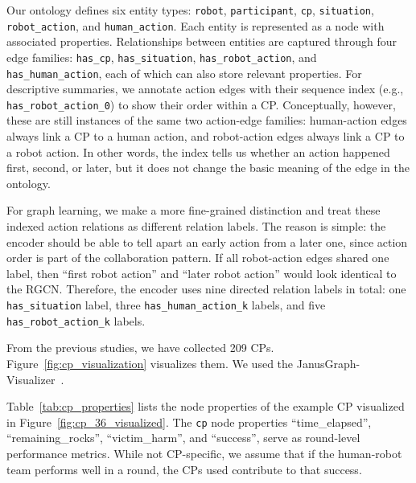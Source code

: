 \documentclass[letterpaper, 10 pt, conference]{ieeeconf}  %
\begin{document}
Our ontology defines six entity types: \texttt{robot}, \texttt{participant},
\texttt{cp}, \texttt{situation}, \texttt{robot\_action}, and \texttt{human\_action}.
Each entity is represented as a node with associated properties. Relationships between
entities are captured through four edge families: \texttt{has\_cp},
\texttt{has\_situation}, \texttt{has\_robot\_action}, and \texttt{has\_human\_action},
each of which can also store relevant properties. For descriptive summaries, we annotate
action edges with their sequence index (e.g., \texttt{has\_robot\_action\_0}) to show
their order within a CP. Conceptually, however, these are still instances of the same
two action-edge families: human-action edges always link a CP to a human action, and
robot-action edges always link a CP to a robot action. In other words, the index tells
us whether an action happened first, second, or later, but it does not change the basic
meaning of the edge in the ontology.

For graph learning, we make a more fine-grained distinction and treat these indexed
action relations as different relation labels. The reason is simple: the encoder should
be able to tell apart an early action from a later one, since action order is part of
the collaboration pattern. If all robot-action edges shared one label, then ``first
robot action'' and ``later robot action'' would look identical to the RGCN. Therefore,
the encoder uses nine directed relation labels in total: one \texttt{has\_situation}
label, three \texttt{has\_human\_action\_k} labels, and five
\texttt{has\_robot\_action\_k} labels.

From the previous studies, we have collected 209 CPs. Figure~\ref{fig:cp_visualization}
visualizes them. We used the JanusGraph-Visualizer~\cite{janusgraph_2024}. 


Table~\ref{tab:cp_properties} lists the node properties of the example CP visualized in
Figure~\ref{fig:cp_36_visualized}. The \texttt{cp} node properties ``time\_elapsed'',
``remaining\_rocks'', ``victim\_harm'', and ``success'', serve as round-level
performance metrics. While not CP-specific, we assume that if the human-robot team
performs well in a round, the CPs used contribute to that success.
\end{document}
